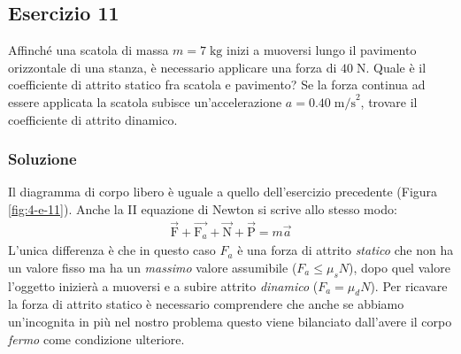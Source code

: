 \documentclass[12pt,a4paper]{book}
\begin{document}
\subsection*{Esercizio 11}
Affinché una scatola di massa $m=7\;\text{kg}$ inizi a muoversi lungo il pavimento orizzontale di una stanza, è necessario applicare una forza di $40\;\text{N}$. Quale è il coefficiente di attrito statico fra scatola e pavimento? Se la forza continua ad essere applicata la scatola subisce un'accelerazione $a=0.40\;\text{m/s}^2$, trovare il coefficiente di attrito dinamico.

\subsubsection*{Soluzione}
Il diagramma di corpo libero è uguale a quello dell'esercizio precedente (Figura \ref{fig:4-e-11}). Anche la II equazione di Newton si scrive allo stesso modo: 
%
\begin{gather*}
\vec{\text{F}}+\vec{\text{F}_a}+\vec{\text{N}}+\vec{\text{P}}=m\vec{a}
\end{gather*}
%
L'unica differenza è che in questo caso $F_a$ è una forza di attrito \textit{statico} che non ha un valore fisso ma ha un \textit{massimo} valore assumibile ($F_a\leq\mu_sN$), dopo quel valore l'oggetto inizierà a muoversi e a subire attrito \textit{dinamico} ($F_a=\mu_dN$). Per ricavare la forza di attrito statico è necessario comprendere che anche se abbiamo un'incognita in più nel nostro problema questo viene bilanciato dall'avere il corpo \textit{fermo} come condizione ulteriore.
\end{document}
